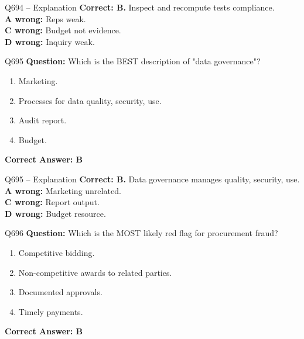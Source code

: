 \documentclass[aspectratio=169,10pt]{beamer}
\begin{document}
	\begin{frame}[t]{Q694 -- Explanation}
		\small
		\textbf{Correct: B.} Inspect and recompute tests compliance. \\[4pt]
		\textbf{A wrong:} Reps weak. \\[2pt]
		\textbf{C wrong:} Budget not evidence. \\[2pt]
		\textbf{D wrong:} Inquiry weak.
	\end{frame}
	
	\begin{frame}[t]{Q695}
		\small
		\textbf{Question:} Which is the BEST description of "data governance"?
		\begin{enumerate}[label=\Alph*.,itemsep=1pt,topsep=2pt]
			\item Marketing.
			\item Processes for data quality, security, use.
			\item Audit report.
			\item Budget.
		\end{enumerate}
		\vspace{4pt}
		\textbf{Correct Answer: B}
	\end{frame}
	
	\begin{frame}[t]{Q695 -- Explanation}
		\small
		\textbf{Correct: B.} Data governance manages quality, security, use. \\[4pt]
		\textbf{A wrong:} Marketing unrelated. \\[2pt]
		\textbf{C wrong:} Report output. \\[2pt]
		\textbf{D wrong:} Budget resource.
	\end{frame}
	
	\begin{frame}[t]{Q696}
		\small
		\textbf{Question:} Which is the MOST likely red flag for procurement fraud?
		\begin{enumerate}[label=\Alph*.,itemsep=1pt,topsep=2pt]
			\item Competitive bidding.
			\item Non-competitive awards to related parties.
			\item Documented approvals.
			\item Timely payments.
		\end{enumerate}
		\vspace{4pt}
		\textbf{Correct Answer: B}
	\end{frame}
	
\end{document}
